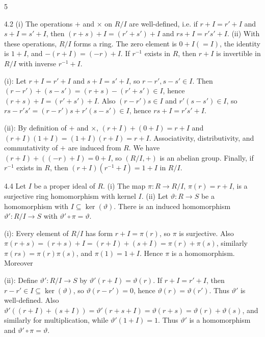 \documentclass[8pt]{extarticle}
\makeatletter
\newcommand{\fitdisplay}[1]{%
  \par\vspace{-1pt}\noindent
  \sbox{\fitdisplaybox}{#1}%
  \makebox[\columnwidth][c]{%
    \ifdim\wd\fitdisplaybox>\columnwidth
      \resizebox{\columnwidth}{!}{#1}%
    \else
      \usebox{\fitdisplaybox}%
    \fi
  }%
  \par\vspace{-1pt}%
}
\renewenvironment{proof}[1][\proofname]{%
  \par%
  \pushQED{\qed}%
  \normalfont
  \topsep=2pt\partopsep=0pt\parsep=0pt\itemsep=0pt%
  \trivlist
  \item[\hskip\labelsep\itshape #1\@addpunct{.}]\ignorespaces
}{%
  \popQED\endtrivlist\@endpefalse
  \vspace{-1pt}%
}
\makeatother
\begin{document}
\begin{multicols*}{5}
        \begin{lemma}{4.2}
            (i) The operations \(+\) and \(\times\) on \(R/I\) are well-defined, i.e. if \(r+I=r'+I\) and \(s+I=s'+I\), then \((r+s)+I=(r'+s')+I\) and \(rs+I=r's'+I\). (ii) With these operations, \(R/I\) forms a ring. The zero element is \(0+I(=I)\), the identity is \(1+I\), and \(-(r+I)=(-r)+I\). If \(r^{-1}\) exists in \(R\), then \(r+I\) is invertible in \(R/I\) with inverse \(r^{-1}+I\).
        \end{lemma}

        \begin{proof}
            (i): Let \(r+I=r'+I\) and \(s+I=s'+I\), so \(r-r',s-s'\in I\). Then \((r-r')+(s-s')=(r+s)-(r'+s')\in I\), hence \((r+s)+I=(r'+s')+I\). Also \((r-r')s\in I\) and \(r'(s-s')\in I\), so \(rs-r's'=(r-r')s+r'(s-s')\in I\), hence \(rs+I=r's'+I\).

            (ii): By definition of \(+\) and \(\times\), \((r+I)+(0+I)=r+I\) and \((r+I)(1+I)=(1+I)(r+I)=r+I\). Associativity, distributivity, and commutativity of \(+\) are induced from \(R\). We have \((r+I)+((-r)+I)=0+I\), so \((R/I,+)\) is an abelian group. Finally, if \(r^{-1}\) exists in \(R\), then \((r+I)(r^{-1}+I)=1+I\) in \(R/I\).
        \end{proof}

        \begin{lemma}{4.4}
            Let \(I\) be a proper ideal of \(R\). (i) The map \(\pi:R\to R/I\), \(\pi(r)=r+I\), is a surjective ring homomorphism with kernel \(I\). (ii) Let \(\vartheta:R\to S\) be a homomorphism with \(I\subseteq\ker(\vartheta)\). There is an induced homomorphism \(\vartheta':R/I\to S\) with \(\vartheta'\circ\pi=\vartheta\).
        \end{lemma}

        \begin{proof}
            (i): Every element of \(R/I\) has form \(r+I=\pi(r)\), so \(\pi\) is surjective. Also \(\pi(r+s)=(r+s)+I=(r+I)+(s+I)=\pi(r)+\pi(s)\), similarly \(\pi(rs)=\pi(r)\pi(s)\), and \(\pi(1)=1+I\). Hence \(\pi\) is a homomorphism. Moreover
            \fitdisplay{\(\ker(\pi)=\{r\in R:\pi(r)=0+I\}=\{r\in R:r+I=I\}=I.\)}

            (ii): Define \(\vartheta':R/I\to S\) by \(\vartheta'(r+I)=\vartheta(r)\). If \(r+I=r'+I\), then \(r-r'\in I\subseteq\ker(\vartheta)\), so \(\vartheta(r-r')=0\), hence \(\vartheta(r)=\vartheta(r')\). Thus \(\vartheta'\) is well-defined. Also \(\vartheta'((r+I)+(s+I))=\vartheta'(r+s+I)=\vartheta(r+s)=\vartheta(r)+\vartheta(s)\), and similarly for multiplication, while \(\vartheta'(1+I)=1\). Thus \(\vartheta'\) is a homomorphism and \(\vartheta'\circ\pi=\vartheta\).
        \end{proof}


\end{multicols*}
\end{document}
